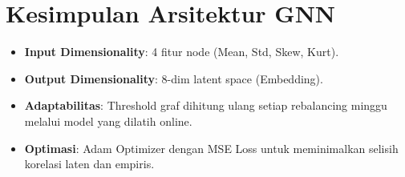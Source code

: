 \documentclass[12pt,a4paper]{article}
\begin{document}
\section{Kesimpulan Arsitektur GNN}

\begin{itemize}
    \item \textbf{Input Dimensionality}: 4 fitur node (Mean, Std, Skew, Kurt).
    \item \textbf{Output Dimensionality}: 8-dim latent space (Embedding).
    \item \textbf{Adaptabilitas}: Threshold graf dihitung ulang setiap rebalancing minggu melalui model yang dilatih online.
    \item \textbf{Optimasi}: Adam Optimizer dengan MSE Loss untuk meminimalkan selisih korelasi laten dan empiris.
\end{itemize}
\end{document}
